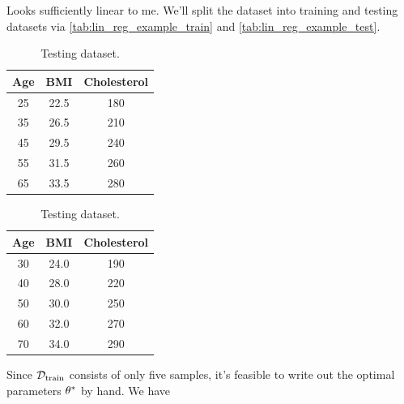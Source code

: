 \documentclass[11pt]{article}
\begin{document}
\noindent Looks sufficiently linear to me. We'll split the dataset into training and testing datasets via \autoref{tab:lin_reg_example_train} and \autoref{tab:lin_reg_example_test}.
\begin{table}[ht]
    \begin{center}
        \begin{minipage}{0.49\textwidth}
            \begin{center}
                \begin{tabular}{c|c||c}
                    Age & BMI & Cholesterol\\
                    \hline
                    \hline
                    25 & 22.5 & 180 \\
                    35 & 26.5 & 210 \\
                    45 & 29.5 & 240 \\
                    55 & 31.5 & 260 \\
                    65 & 33.5 & 280 \\
                    \hline
                \end{tabular}
                \caption{Training dataset.}
                \label{tab:lin_reg_example_train}
            \end{center}
        \end{minipage} \hfill
        \begin{minipage}{0.49\textwidth}
            \begin{center}
                \begin{tabular}{c|c||c}
                    Age & BMI & Cholesterol\\
                    \hline
                    \hline
                    30 & 24.0 & 190 \\
                    40 & 28.0 & 220 \\
                    50 & 30.0 & 250 \\
                    60 & 32.0 & 270 \\
                    70 & 34.0 & 290 \\
                    \hline
                \end{tabular}
                \caption{Testing dataset.}
                \label{tab:lin_reg_example_test}
            \end{center}
        \end{minipage}
    \end{center}
\end{table}
Since $\mathcal{D}_{\text{train}}$ consists of only five samples, it's feasible to write out the optimal parameters $\theta^{*}$ by hand. We have
\end{document}
